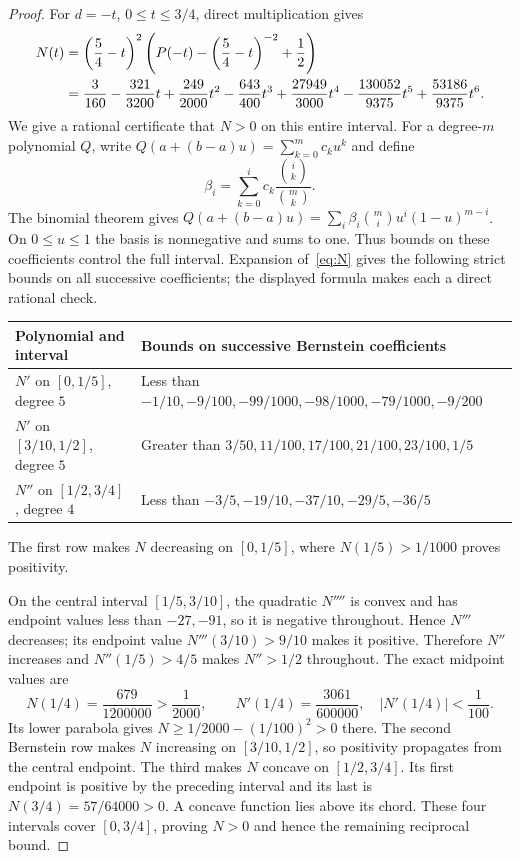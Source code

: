 \documentclass[11pt]{article}
\begin{document}
\begin{proof}
For $d=-t$, $0\le t\le3/4$, direct multiplication gives
\begin{align}
 N(t)&=\left(\frac54-t\right)^2
       \left(P(-t)-\left(\frac54-t\right)^{-2}+\frac12\right)
       \notag\\
 &=\frac3{160}-\frac{321}{3200}t+\frac{249}{2000}t^2
   -\frac{643}{400}t^3+\frac{27949}{3000}t^4
   -\frac{130052}{9375}t^5+\frac{53186}{9375}t^6.
 \label{eq:N}
\end{align}
We give a rational certificate that $N>0$ on this entire interval.
For a degree-$m$ polynomial $Q$, write
$Q(a+(b-a)u)=\sum_{k=0}^m c_k u^k$ and define
\[
 \beta_i=\sum_{k=0}^i c_k\frac{\binom ik}{\binom mk}.
\]
The binomial theorem gives
$Q(a+(b-a)u)=\sum_i\beta_i\binom mi u^i(1-u)^{m-i}$.
On $0\le u\le1$ the basis is nonnegative and sums to one.
Thus bounds on these coefficients control the full interval.
Expansion of~\eqref{eq:N} gives the following strict bounds on all
successive coefficients; the displayed formula makes each a direct
rational check.
\begin{center}
\small
\begin{tabular}{p{.23\linewidth}p{.68\linewidth}}\toprule
Polynomial and interval&Bounds on successive Bernstein coefficients\\\midrule
$N'$ on $[0,1/5]$, degree $5$&
Less than $-1/10,-9/100,-99/1000,-98/1000,-79/1000,-9/200$\\[2mm]
$N'$ on $[3/10,1/2]$, degree $5$&
Greater than $3/50,11/100,17/100,21/100,23/100,1/5$\\[2mm]
$N''$ on $[1/2,3/4]$, degree $4$&
Less than $-3/5,-19/10,-37/10,-29/5,-36/5$\\\bottomrule
\end{tabular}
\end{center}
The first row makes $N$ decreasing on $[0,1/5]$, where
$N(1/5)>1/1000$ proves positivity.

On the central interval $[1/5,3/10]$, the quadratic $N''''$ is
convex and has endpoint values less than $-27,-91$, so it is
negative throughout. Hence $N'''$ decreases; its endpoint value
$N'''(3/10)>9/10$ makes it positive. Therefore $N''$ increases
and $N''(1/5)>4/5$ makes $N''>1/2$ throughout. The exact midpoint
values are
\[
 N(1/4)=\frac{679}{1200000}>\frac1{2000},\qquad
 N'(1/4)=\frac{3061}{600000},\quad |N'(1/4)|<\frac1{100}.
\]
Its lower parabola gives $N\ge1/2000-(1/100)^2>0$ there.
The second Bernstein row makes $N$ increasing on $[3/10,1/2]$,
so positivity propagates from the central endpoint. The third makes
$N$ concave on $[1/2,3/4]$. Its first endpoint is positive by the
preceding interval and its last is $N(3/4)=57/64000>0$.
A concave function lies above its chord. These four intervals cover
$[0,3/4]$, proving $N>0$ and hence the remaining reciprocal bound.
\end{proof}
\end{document}
